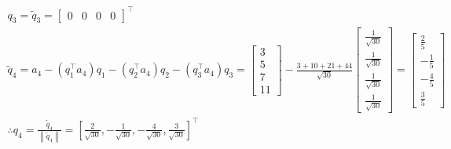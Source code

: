 \documentclass[english,onecolumn]{IEEEtran}
\begin{document}
\begin{enumerate}
$$
\begin{array}{l}
q_{3}=\tilde{q}_{3}=\left[\begin{array}{llll}
0 & 0 & 0 & 0
\end{array}\right]^{\top} \\
\tilde{q}_{4}=a_{4}-\left(q_{1}^{\top} a_{4}\right) q_{1}-\left(q_{2}^{\top} a_{4}\right) q_{2}-\left(q_{3}^{\top} a_{4}\right) q_{3}= \left[\begin{array}{c}3 \\ 5 \\ 7 \\ 11\end{array}\right]-\frac{3+10+21+44}{\sqrt{30}}\left[\begin{array}{c}\frac{1}{\sqrt{30}} \\ \frac{1}{\sqrt{30}} \\ \frac{1}{\sqrt{30}} \\ \frac{1}{\sqrt{30}}\end{array}\right]=\left[\begin{array}{c}\frac{2}{5} \\ -\frac{1}{5} \\ -\frac{4}{5} \\ \frac{3}{5}\end{array}\right]\\
\therefore q_{4}=\frac{\tilde{q}_{4}}{\left\|\tilde{q}_{4}\right\|}=\left[\frac{2}{\sqrt{30}},-\frac{1}{\sqrt{30}},-\frac{4}{\sqrt{30}}, \frac{3}{\sqrt{30}}\right]^{\top}
\end{array}
$$


\end{enumerate}
\end{document}
